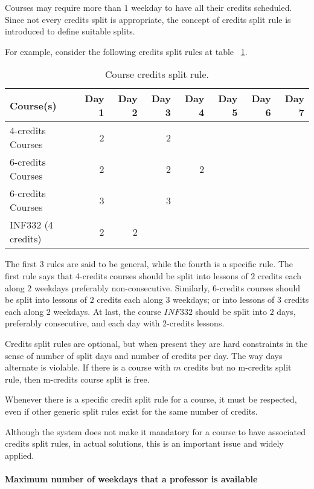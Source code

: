 Courses may require more than $1$ weekday to have all their credits scheduled. Since not every credits split is appropriate, the concept of credits split rule is introduced to define suitable splits.

For example, consider the following credits split rules at table ~\ref{tab:split}.

\begin{table}[H]
\centering
\begin{tabular}{l|r|r|r|r|r|r|r}
Course(s) & Day 1 & Day 2 & Day 3 & Day 4 & Day 5 & Day 6 & Day 7 \\\hline
4-credits Courses & 2 & & 2 & & & & \\
6-credits Courses & 2 & & 2 & 2 & & & \\
6-credits Courses & 3 & & 3 & & & & \\
INF332 (4 credits) & 2 & 2 & & & & & \\
\end{tabular}
\caption{\label{tab:split}Course credits split rule.}
\end{table}

The first $3$ rules are said to be general, while the fourth is a specific rule. The first rule says that 4-credits courses should be split into lessons of $2$ credits each along $2$ weekdays preferably non-consecutive. Similarly, 6-credits courses should be split into lessons of $2$ credits each along $3$ weekdays; or into lessons of $3$ credits each along $2$ weekdays. At last, the course $INF332$ should be split into $2$ days, preferably consecutive, and each day with 2-credits lessons.

Credits split rules are optional, but when present they are hard constraints in the sense of number of split days and number of credits per day. The way days alternate is violable. If there is a course with $m$ credits but no m-credits split rule, then m-credits course split is free.

Whenever there is a specific credit split rule for a course, it must be respected, even if other generic split rules exist for the same number of credits.

Although the system does not make it mandatory for a course to have associated credits split rules, in actual solutions, this is an important issue and widely applied.


\paragraph{Maximum number of weekdays that a professor is available}
\label{constrmaxdaysprof}

